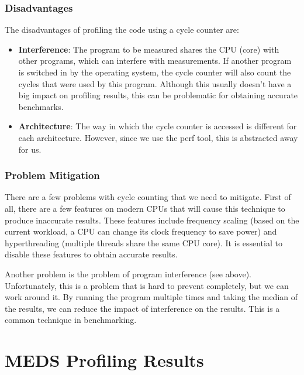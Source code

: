 \documentclass[11pt,a4paper]{report}
\theoremstyle{definition}
\begin{document}
\subsubsection{Disadvantages}
The disadvantages of profiling the code using a cycle counter are:
\begin{itemize}
  \item \textbf{Interference}: The program to be measured shares the CPU (core) with other programs, which can interfere with measurements. If another program is switched in by the operating system, the cycle counter will also count the cycles that were used by this program. Although this usually doesn't have a big impact on profiling results, this can be problematic for obtaining accurate benchmarks.
  \item \textbf{Architecture}: The way in which the cycle counter is accessed is different for each architecture. However, since we use the perf tool, this is abstracted away for us.
\end{itemize}

\subsubsection{Problem Mitigation}
There are a few problems with cycle counting that we need to mitigate. First of all, there are a few features on modern CPUs that will cause this technique to produce inaccurate results. These features include frequency scaling (based on the current workload, a CPU can change its clock frequency to save power) and hyperthreading (multiple threads share the same CPU core). It is essential to disable these features to obtain accurate results.

Another problem is the problem of program interference (see above). Unfortunately, this is a problem that is hard to prevent completely, but we can work around it. By running the program multiple times and taking the median of the results, we can reduce the impact of interference on the results. This is a common technique in benchmarking.

\section{MEDS Profiling Results}
\label{sec:medsprofilingresults}
\end{document}
